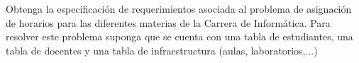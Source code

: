 Obtenga la especificación de requerimientos asociada al problema de asignación de horarios para las diferentes materias de la Carrera de Informática. Para resolver este problema suponga que se cuenta con una tabla de estudiantes, una tabla de docentes y una tabla de infraestructura (aulas, laboratorios,...)

